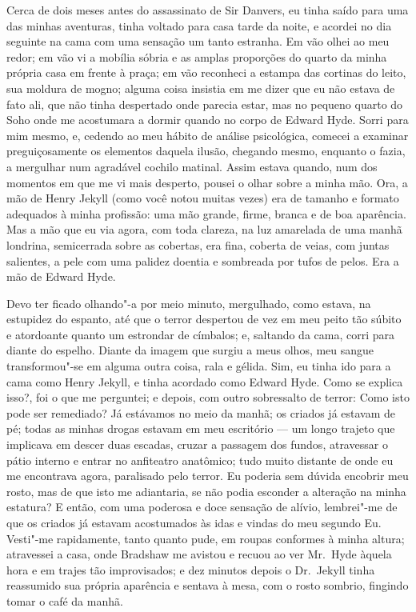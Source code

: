 Cerca de dois meses antes do assassinato de Sir Danvers, eu tinha saído
para uma das minhas aventuras, tinha voltado para casa tarde da noite,
e acordei no dia seguinte na cama com uma sensação um tanto estranha. 
Em vão olhei ao meu redor; em vão vi a mobília sóbria e as amplas
proporções do quarto da minha própria casa em frente à praça; em vão
reconheci a estampa das cortinas do leito, sua moldura de mogno; alguma
coisa insistia em me dizer que eu não estava de fato ali, que não tinha
despertado onde parecia estar, mas no pequeno quarto do Soho onde me
acostumara a dormir quando no corpo de Edward Hyde.  Sorri para mim
mesmo, e, cedendo ao meu hábito de análise psicológica, comecei a
examinar preguiçosamente os elementos daquela ilusão, chegando mesmo,
enquanto o fazia, a mergulhar num agradável cochilo matinal.  Assim
estava quando, num dos momentos em que me vi mais desperto, pousei o
olhar sobre a minha mão.  Ora, a mão de Henry Jekyll (como você notou
muitas vezes) era de tamanho e formato adequados à minha profissão: uma
mão grande, firme, branca e de boa aparência. Mas a mão que eu via
agora, com toda clareza, na luz amarelada de uma manhã londrina,
semicerrada sobre as cobertas, era fina, coberta de veias, com juntas
salientes, a pele com uma palidez doentia e sombreada por tufos de
pelos.  Era a mão de Edward Hyde.

Devo ter ficado olhando"-a por meio minuto, mergulhado, como estava, na
estupidez do espanto, até que o terror despertou de vez em meu peito
tão súbito e atordoante quanto um estrondar de címbalos; e, saltando da
cama, corri para diante do espelho.  Diante da imagem que surgiu
a meus olhos, meu sangue transformou"-se em alguma outra coisa, rala e
gélida.  Sim, eu tinha ido para a cama como Henry Jekyll, e tinha
acordado como Edward Hyde.  Como se explica isso?, foi o que me
perguntei; e depois, com outro sobressalto de terror: Como isto pode
ser remediado?  Já estávamos no meio da manhã; os criados já estavam de
pé; todas as minhas drogas estavam em meu escritório --- um longo trajeto
que implicava em descer duas escadas, cruzar a passagem dos fundos,
atravessar o pátio interno e entrar no anfiteatro anatômico; tudo muito
distante de onde eu me encontrava agora, paralisado pelo terror.  Eu
poderia sem dúvida encobrir meu rosto, mas de que isto me adiantaria,
se não podia esconder a alteração na minha estatura?  E então, com uma
poderosa e doce sensação de alívio, lembrei"-me de que os criados já
estavam acostumados às idas e vindas do meu segundo Eu.  Vesti"-me
rapidamente, tanto quanto pude, em roupas conformes à minha altura;
atravessei a casa, onde Bradshaw me avistou e recuou ao ver Mr.~Hyde
àquela hora e em trajes tão improvisados; e dez minutos depois o Dr.~Jekyll 
tinha reassumido sua própria aparência e sentava à mesa, com o
rosto sombrio, fingindo tomar o café da manhã.

